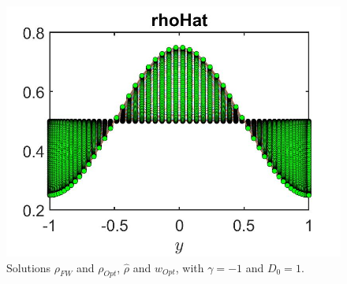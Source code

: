 \documentclass[11pt, a4paper]{article}
\theoremstyle{definition}
\begin{document}
\begin{figure}[h]
	\includegraphics[scale=0.3]{NFrhoHat1.jpg}
	\caption{Solutions $\rho_{FW}$ and $\rho_{Opt}$, $\hat \rho$ and $w_{Opt}$, with $\gamma = -1$ and $D_0 = 1$.}
	\label{rhoNF1}
\end{figure}
\end{document}
